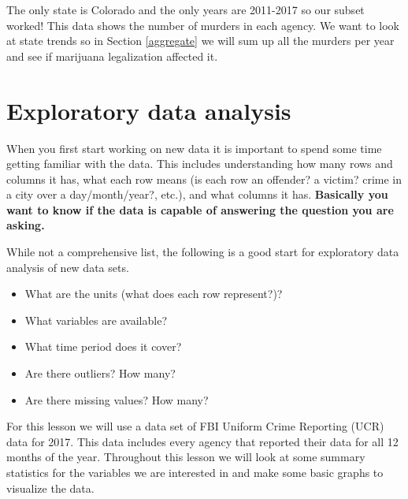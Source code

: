 \documentclass[
]{krantz}
\makeatletter
\newenvironment{Shaded}{\begin{snugshade}}{\end{snugshade}}
\newcommand{\CommentTok}[1]{\textcolor[rgb]{0.37,0.37,0.37}{\textit{#1}}}
\newcommand{\FunctionTok}[1]{\textcolor[rgb]{0,0,0}{#1}}
\newcommand{\NormalTok}[1]{#1}
\newcommand{\SpecialCharTok}[1]{\textcolor[rgb]{0,0,0}{#1}}
\providecommand{\tightlist}{%
  \setlength{\itemsep}{0pt}\setlength{\parskip}{0pt}}
\newenvironment{kframe}{%
\medskip{}
\setlength{\fboxsep}{.8em}
 \def\at@end@of@kframe{}%
 \ifinner\ifhmode%
  \def\at@end@of@kframe{\end{minipage}}%
  \begin{minipage}{\columnwidth}%
 \fi\fi%
 \def\FrameCommand##1{\hskip\@totalleftmargin \hskip-\fboxsep
 \colorbox{shadecolor}{##1}\hskip-\fboxsep
     \hskip-\linewidth \hskip-\@totalleftmargin \hskip\columnwidth}%
 \MakeFramed {\advance\hsize-\width
   \@totalleftmargin\z@ \linewidth\hsize
   \@setminipage}}%
 {\par\unskip\endMakeFramed%
 \at@end@of@kframe}
\renewenvironment{Shaded}{\begin{kframe}}{\end{kframe}}
\makeatother
\begin{document}
\begin{Shaded}
\end{Shaded}

\begin{Shaded}
\end{Shaded}

The only state is Colorado and the only years are 2011-2017 so our subset worked! This data shows the number of murders in each agency. We want to look at state trends so in Section \ref{aggregate} we will sum up all the murders per year and see if marijuana legalization affected it.

\hypertarget{explore}{%
\chapter{Exploratory data analysis}\label{explore}}

When you first start working on new data it is important to spend some time getting familiar with the data. This includes understanding how many rows and columns it has, what each row means (is each row an offender? a victim? crime in a city over a day/month/year?, etc.), and what columns it has. \textbf{Basically you want to know if the data is capable of answering the question you are asking.}

While not a comprehensive list, the following is a good start for exploratory data analysis of new data sets.

\begin{itemize}
\tightlist
\item
  What are the units (what does each row represent?)?
\item
  What variables are available?
\item
  What time period does it cover?
\item
  Are there outliers? How many?
\item
  Are there missing values? How many?
\end{itemize}

For this lesson we will use a data set of FBI Uniform Crime Reporting (UCR) data for 2017. This data includes every agency that reported their data for all 12 months of the year. Throughout this lesson we will look at some summary statistics for the variables we are interested in and make some basic graphs to visualize the data.
\end{document}
